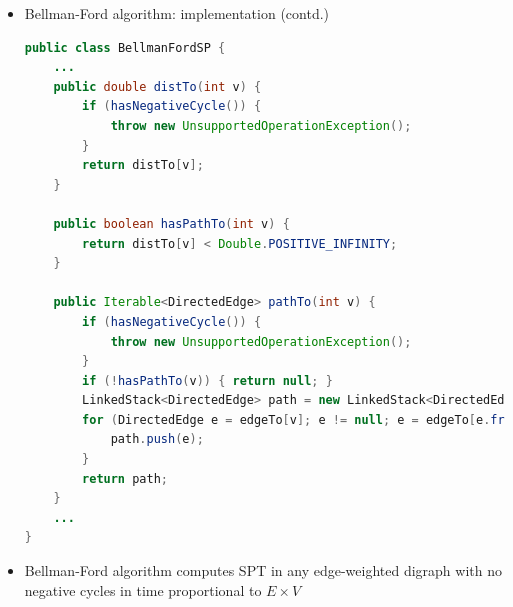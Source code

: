 \documentclass[8pt,a4paper,compress]{beamer}
\begin{document}
\begin{frame}[fragile]
\begin{itemize}
\item Bellman-Ford algorithm: implementation (contd.)
\begin{lstlisting}[language=Java]
public class BellmanFordSP {
    ...
    public double distTo(int v) {
        if (hasNegativeCycle()) { 
            throw new UnsupportedOperationException(); 
        }
        return distTo[v];
    }

    public boolean hasPathTo(int v) { 
        return distTo[v] < Double.POSITIVE_INFINITY; 
    }
    
    public Iterable<DirectedEdge> pathTo(int v) {
        if (hasNegativeCycle()) { 
            throw new UnsupportedOperationException(); 
        }
        if (!hasPathTo(v)) { return null; }
        LinkedStack<DirectedEdge> path = new LinkedStack<DirectedEdge>();
        for (DirectedEdge e = edgeTo[v]; e != null; e = edgeTo[e.from()]) {
            path.push(e);
        }
        return path;
    }
    ...
}
\end{lstlisting}

\item Bellman-Ford algorithm computes SPT in any edge-weighted digraph with no negative cycles in time proportional to $E \times V$
\end{itemize}
\end{frame}
\end{document}
